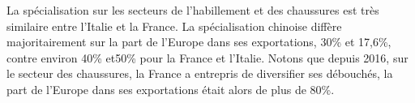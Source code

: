 \documentclass[french,10pt,a4paper]{article}
\begin{document}
La spécialisation sur les secteurs de l'habillement et des chaussures est très similaire entre l'Italie et la France. La spécialisation chinoise diffère majoritairement sur la part de l'Europe dans ses exportations, 30\% et 17,6\%, contre environ 40\% et50\% pour la France et l'Italie. Notons que depuis 2016, sur le secteur des chaussures, la France a entrepris de diversifier ses débouchés, la part de l'Europe dans ses exportations était alors de plus de 80\%. 





  
\end{document}
